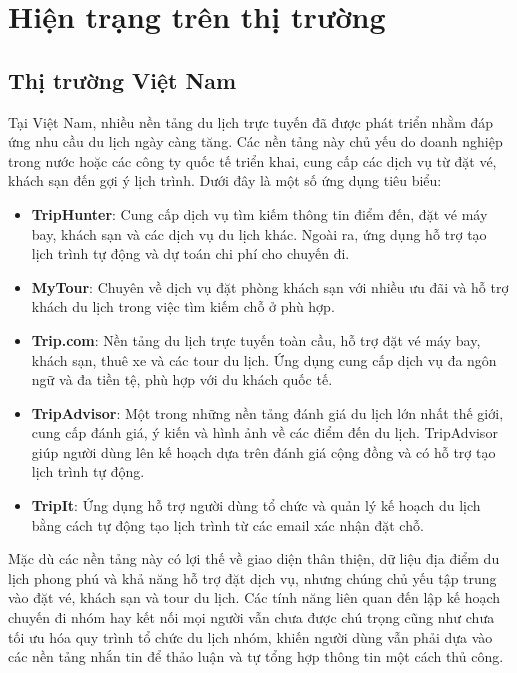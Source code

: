 \section{Hiện trạng trên thị trường}
\subsection{Thị trường Việt Nam}

Tại Việt Nam, nhiều nền tảng du lịch trực tuyến đã được phát triển nhằm đáp ứng nhu cầu du lịch ngày càng tăng. Các nền tảng này chủ yếu do doanh nghiệp trong nước hoặc các công ty quốc tế triển khai, cung cấp các dịch vụ từ đặt vé, khách sạn đến gợi ý lịch trình. Dưới đây là một số ứng dụng tiêu biểu:

\begin{itemize}
    \item \textbf{TripHunter}\cite{triphunter}: Cung cấp dịch vụ tìm kiếm thông tin điểm đến, đặt vé máy bay, khách sạn và các dịch vụ du lịch khác. Ngoài ra, ứng dụng hỗ trợ tạo lịch trình tự động và dự toán chi phí cho chuyến đi.

    \item \textbf{MyTour}\cite{mytour}: Chuyên về dịch vụ đặt phòng khách sạn với nhiều ưu đãi và hỗ trợ khách du lịch trong việc tìm kiếm chỗ ở phù hợp.

    \item \textbf{Trip.com}\cite{tripcom}: Nền tảng du lịch trực tuyến toàn cầu, hỗ trợ đặt vé máy bay, khách sạn, thuê xe và các tour du lịch. Ứng dụng cung cấp dịch vụ đa ngôn ngữ và đa tiền tệ, phù hợp với du khách quốc tế.

    \item \textbf{TripAdvisor}\cite{tripadvisor}: Một trong những nền tảng đánh giá du lịch lớn nhất thế giới, cung cấp đánh giá, ý kiến và hình ảnh về các điểm đến du lịch. TripAdvisor giúp người dùng lên kế hoạch dựa trên đánh giá cộng đồng và có hỗ trợ tạo lịch trình tự động.

    \item \textbf{TripIt}\cite{tripit}: Ứng dụng hỗ trợ người dùng tổ chức và quản lý kế hoạch du lịch bằng cách tự động tạo lịch trình từ các email xác nhận đặt chỗ.

\end{itemize}

Mặc dù các nền tảng này có lợi thế về giao diện thân thiện, dữ liệu địa điểm du lịch phong phú và khả năng hỗ trợ đặt dịch vụ, nhưng chúng chủ yếu tập trung vào đặt vé, khách sạn và tour du lịch. Các tính năng liên quan đến lập kế hoạch chuyến đi nhóm hay kết nối mọi người vẫn chưa được chú trọng cũng như chưa tối ưu hóa quy trình tổ chức du lịch nhóm, khiến người dùng vẫn phải dựa vào các nền tảng nhắn tin để thảo luận và tự tổng hợp thông tin một cách thủ công.



